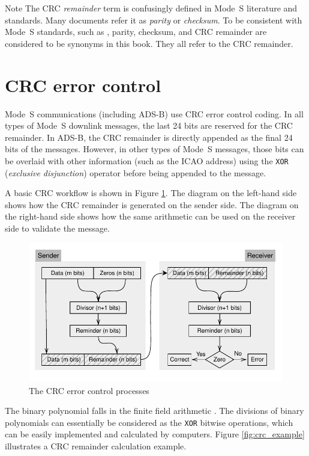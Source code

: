 \begin{notebox}{Note}
The CRC \emph{remainder} term is confusingly defined in Mode~S literature and standards. Many documents refer it as \emph{parity} or \emph{checksum}. To be consistent with Mode~S standards, such as \cite{icao9871v1, rtca2011mops}, parity, checksum, and CRC remainder are considered to be synonyms in this book. They all refer to the CRC remainder.
\end{notebox}

\section{CRC error control}

Mode~S communications (including ADS-B) use CRC error control coding. In all types of Mode~S downlink messages, the last 24 bits are reserved for the CRC remainder. In ADS-B, the CRC remainder is directly appended as the final 24 bits of the messages. However, in other types of Mode~S messages, those bits can be overlaid with other information (such as the ICAO address) using the \texttt{XOR} (\emph{exclusive disjunction}) operator before being appended to the message.

A basic CRC workflow is shown in Figure \ref{fig:crc_flow}. The diagram on the left-hand side shows how the CRC remainder is generated on the sender side. The diagram on the right-hand side shows how the same arithmetic can be used on the receiver side to validate the message.

\begin{figure}[ht]
  \includegraphics[scale=0.9]{figures/crc/crc_flow.pdf}
  \caption{The CRC error control processes}
  \label{fig:crc_flow}
\end{figure}


The binary polynomial falls in the finite field arithmetic \cite{carlitz1932}. The divisions of binary polynomials can essentially be considered as the \texttt{XOR} bitwise operations, which can be easily implemented and calculated by computers. Figure \ref{fig:crc_example} illustrates a CRC remainder calculation example.



